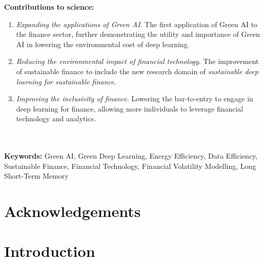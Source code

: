 \documentclass[a4paper, 11pt]{report}
\begin{document}
    \textbf{Contributions to science:} 
    \begin{enumerate}
        \item \emph{Expanding the applications of Green AI}. The first application of Green AI to the finance sector, further demonstrating the utility and importance of Green AI in lowering the environmental cost of deep learning. 

        \item \emph{Reducing the environmental impact of financial technology}. The improvement of sustainable finance to include the new research domain of \emph{sustainable deep learning for sustainable finance}. 

        \item \emph{Improving the inclusivity of finance}. Lowering the bar-to-entry to engage in deep learning for finance,  allowing more individuals to leverage financial technology and analytics.
    \end{enumerate}
    
    \textbf{\\ \\Keywords:} Green AI, Green Deep Learning, Energy Efficiency, Data Efficiency, Sustainable Finance, Financial Technology, Financial Volatility Modelling, Long Short-Term Memory


    \newpage
    \chapter*{Acknowledgements}


    \newpage
    \tableofcontents


    \newpage 
    \listoffigures


    \newpage
    \listoftables 




    \newpage
    \chapter{Introduction}
    \label{chapter: intro}
\end{document}
